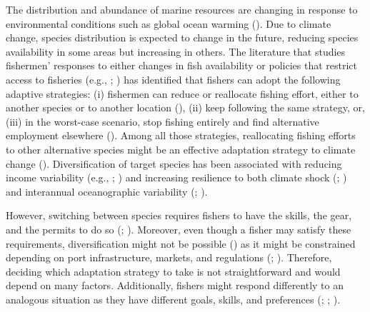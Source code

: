 \documentclass[
  11pt,
]{article}
\begin{document}
The distribution and abundance of marine resources are changing in
response to environmental conditions such as global ocean warming
(). Due to
climate change, species distribution is expected to change in the
future, reducing species availability in some areas but increasing in
others. The literature that studies fishermen' responses to either
changes in fish availability or policies that restrict access to
fisheries (e.g., ;
)
has identified that fishers can adopt the following adaptive strategies:
(i) fishermen can reduce or reallocate fishing effort, either to another
species or to another location
(), (ii)
keep following the same strategy, or, (iii) in the worst-case scenario,
stop fishing entirely and find alternative employment elsewhere
(). Among all those
strategies, reallocating fishing efforts to other alternative species
might be an effective adaptation strategy to climate change
(). Diversification of
target species has been associated with reducing income variability
(e.g., ;
) and increasing
resilience to both climate shock (; ) and
interannual oceanographic variability
(;
).

However, switching between species requires fishers to have the skills,
the gear, and the permits to do so
(;
). Moreover, even
though a fisher may satisfy these requirements, diversification might
not be possible () as it might be constrained depending on port infrastructure,
markets, and regulations (; ).
Therefore, deciding which adaptation strategy to take is not
straightforward and would depend on many factors. Additionally, fishers
might respond differently to an analogous situation as they have
different goals, skills, and preferences
(;
;
).
\end{document}

